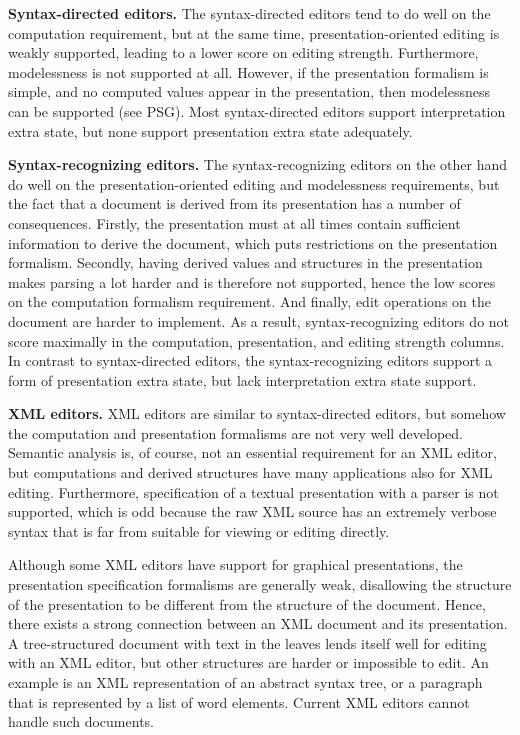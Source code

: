 {\bf Syntax-directed editors.} The syntax-directed editors tend to do well on the computation requirement, but at the same time, presentation-oriented editing is weakly supported, leading to a lower score on editing strength. Furthermore, modelessness is not supported at all. However, if the presentation formalism is simple, and no computed values appear in the presentation, then modelessness can be supported (see PSG). Most syntax-directed editors support interpretation extra state, but none support presentation extra state adequately.

{\bf Syntax-recognizing editors.} The syntax-recognizing editors on the other hand do well on the presentation-oriented editing and modelessness requirements, but the fact that a document is derived from its presentation has a number of consequences. Firstly, the presentation must at all times contain sufficient information to derive the document, which puts restrictions on the presentation formalism. Secondly, having derived values and structures in the presentation makes parsing a lot harder and is therefore not supported, hence the low scores on the computation formalism requirement. And finally, edit operations on the document are harder to implement. As a result, syntax-recognizing editors do not score maximally in the computation, presentation, and editing strength columns. In contrast to syntax-directed editors, the syntax-recognizing editors support a form of presentation extra state, but lack interpretation extra state support.

{\bf XML editors.} XML editors are similar to syntax-directed editors, but somehow the computation and presentation formalisms are not very well developed. Semantic analysis is, of course, not an essential requirement for an XML editor, but computations and derived structures have many applications also for XML editing. Furthermore, specification of a textual presentation with a parser is not supported, which is odd because the raw XML source has an extremely verbose syntax that is far from suitable for viewing or editing directly.

Although some XML editors have support for graphical presentations, the presentation specification formalisms are generally weak, disallowing the structure of the presentation to be different from the structure of the document. Hence, there exists a strong connection between an XML document and its presentation. A tree-structured document with text in the leaves lends itself well for editing with an XML editor, but other structures are harder or impossible to edit. An example is an XML representation of an abstract syntax tree, or a paragraph that is represented by a list of word elements. Current XML editors cannot handle such documents.

